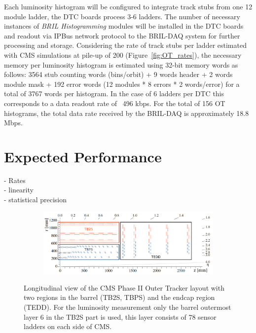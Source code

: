 Each luminosity histogram will be configured to integrate track stubs from one 12 module ladder, the DTC boards process 3-6 ladders.
The number of necessary instances of  {\it BRIL Histogramming} modules will be installed in the DTC boards and readout via IPBus network protocol to the BRIL-DAQ system for further processing and storage.
Considering the rate of track stubs per ladder estimated with CMS simulations at pile-up of 200  (Figure~\ref{fig:OT_rates}),  the necessary memory per luminosity histogram is estimated using 32-bit memory words as follows: 3564 stub counting words (bins/orbit) + 9 words header + 2 words module mask + 192 error words (12 modules * 8 errors * 2 words/error) for a total of 3767 words per histogram.
In the case of 6 ladders per DTC this corresponds to a data readout rate of ~496 kbps.
For the total of 156 OT histograms, the total data rate received by the BRIL-DAQ is approximately 18.8 Mbps.



\section{Expected Performance}
- Rates\\
- linearity \\
- statistical precision



\clearpage

\begin{figure}[hbtp]
\centering
\begin{subfigure}
\centering
\includegraphics[width=.9\linewidth]{tex/Part2/fig/OT/OT-longitudinal.png}
\end{subfigure}
\caption{
  Longitudinal view of the CMS Phase II Outer Tracker layout  with two regions in the barrel (TB2S, TBPS) and the endcap region (TEDD).
  For the luminosity measurement only the barrel outermost layer 6 in the TB2S part is used, this layer consists of 78 sensor ladders on each side of CMS.
}
\label{fig:OT_layout}
\end{figure}



